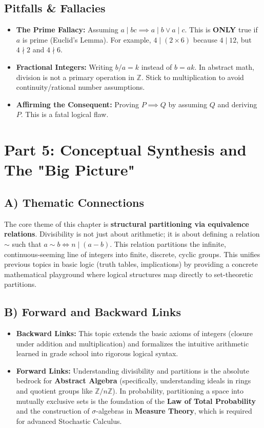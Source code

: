 \documentclass[11pt]{article}
\theoremstyle{definition}
\theoremstyle{remark}
\newcommand{\Z}{\mathbb{Z}}
\begin{document}
\subsection{Pitfalls \& Fallacies}
\begin{itemize}
    \item \textbf{The Prime Fallacy:} Assuming $a \mid bc \implies a \mid b \lor a \mid c$. This is \textbf{ONLY} true if $a$ is prime (Euclid's Lemma). For example, $4 \mid (2 \times 6)$ because $4 \mid 12$, but $4 \nmid 2$ and $4 \nmid 6$.
    \item \textbf{Fractional Integers:} Writing $b/a = k$ instead of $b = ak$. In abstract math, division is not a primary operation in $\Z$. Stick to multiplication to avoid continuity/rational number assumptions.
    \item \textbf{Affirming the Consequent:} Proving $P \implies Q$ by assuming $Q$ and deriving $P$. This is a fatal logical flaw.
\end{itemize}

\newpage
\section{Part 5: Conceptual Synthesis and The "Big Picture"}

\subsection{A) Thematic Connections}
The core theme of this chapter is \textbf{structural partitioning via equivalence relations}. Divisibility is not just about arithmetic; it is about defining a relation $\sim$ such that $a \sim b \iff n \mid (a-b)$. This relation partitions the infinite, continuous-seeming line of integers into finite, discrete, cyclic groups. This unifies previous topics in basic logic (truth tables, implications) by providing a concrete mathematical playground where logical structures map directly to set-theoretic partitions.

\subsection{B) Forward and Backward Links}
\begin{itemize}
    \item \textbf{Backward Links:} This topic extends the basic axioms of integers (closure under addition and multiplication) and formalizes the intuitive arithmetic learned in grade school into rigorous logical syntax.
    \item \textbf{Forward Links:} Understanding divisibility and partitions is the absolute bedrock for \textbf{Abstract Algebra} (specifically, understanding ideals in rings and quotient groups like $\Z/n\Z$). In probability, partitioning a space into mutually exclusive sets is the foundation of the \textbf{Law of Total Probability} and the construction of $\sigma$-algebras in \textbf{Measure Theory}, which is required for advanced Stochastic Calculus.
\end{itemize}
\end{document}

